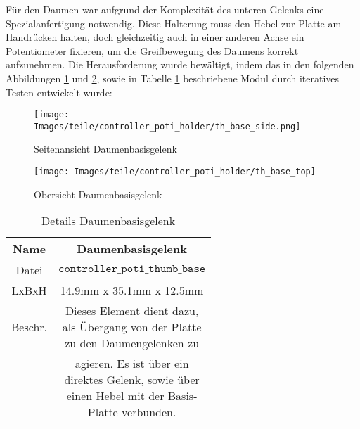 \vspace{3mm}

Für den Daumen war aufgrund der Komplexität des unteren Gelenks eine Spezialanfertigung notwendig. 
Diese Halterung muss den Hebel zur Platte am Handrücken halten, doch gleichzeitig auch in einer anderen Achse ein Potentiometer fixieren, um die Greifbewegung des Daumens korrekt aufzunehmen. 
Die Herausforderung wurde bewältigt, indem das in den folgenden Abbildungen \ref{thbaseside} und \ref{thbasetop}, sowie in Tabelle \ref{tab:th_base} beschriebene Modul durch iteratives Testen entwickelt wurde:

\begin{minipage}{0.5\textwidth}
    \begin{figure}[H]
        \texttt{[image: Images/teile/controller\_poti\_holder/th\_base\_side.png]}
        \centering
        \caption{Seitenansicht Daumenbasisgelenk}
        \label{thbaseside}
    \end{figure}
\end{minipage}
\begin{minipage}{0.5\textwidth}
    \begin{figure}[H]
        \texttt{[image: Images/teile/controller\_poti\_holder/th\_base\_top]}
        \centering
        \caption{Obersicht Daumenbasisgelenk}
        \label{thbasetop}
    \end{figure}
\end{minipage}

\begin{minipage}{0.6\textwidth}
    \begin{table}[H]
        \centering
        \begin{tabular}{|c|c|}
            \hline
            Name&Daumenbasisgelenk\\
            \hline
            Datei&$\texttt{controller}\_ \texttt{poti}\_\texttt{thumb}\_\texttt{base}$\\
            \hline
            LxBxH&14.9mm x 35.1mm x 12.5mm\\
            \hline
            Beschr.&\shortstack{Dieses Element dient dazu,\\als Übergang von der Platte\\zu den Daumengelenken zu}\\
            &\shortstack{agieren. Es ist über ein\\direktes Gelenk, sowie über\\einen Hebel mit der Basis-\\Platte verbunden.}\\
            \hline
        \end{tabular} 
        \caption{Details Daumenbasisgelenk}
        \label{tab:th_base}
    \end{table}
\end{minipage}